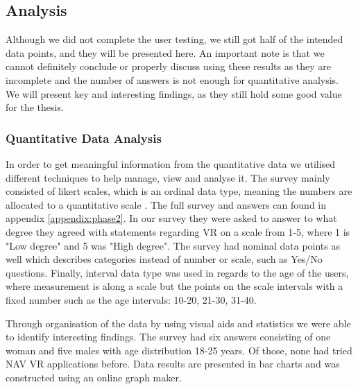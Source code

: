 \subsection{Analysis}
Although we did not complete the user testing, we still got half of the intended data points, and they will be presented here. An important note is that we cannot definitely conclude or properly discuss using these results as they are incomplete and the number of answers is not enough for quantitative analysis.  We will present key and interesting findings, as they still hold some good value for the thesis. 


\subsubsection{Quantitative Data Analysis}
In order to get meaningful information from the quantitative data we utilised different techniques to help manage, view and analyse it. The survey mainly consisted of likert scales, which is an ordinal data type, meaning the numbers are allocated to a quantitative scale \cite{oates2005researching}. The full survey and answers can found in appendix \ref{appendix:phase2}. In our survey they were asked to answer to what degree they agreed with statements regarding VR on a scale from 1-5, where 1 is "Low degree" and 5 was "High degree". The survey had nominal data points as well which describes categories instead of number or scale, such as Yes/No questions. Finally, interval data type was used in regards to the age of the users, where measurement is along a scale but the points on the scale intervals with a fixed number such as the age intervals: 10-20, 21-30, 31-40. 

Through organisation of the data by using visual aids and statistics we were able to identify interesting findings. The survey had six answers consisting of one woman and five males with age distribution 18-25 years. Of those, none had tried NAV VR applications before. Data results are presented in bar charts and was constructed using an online graph maker. 


